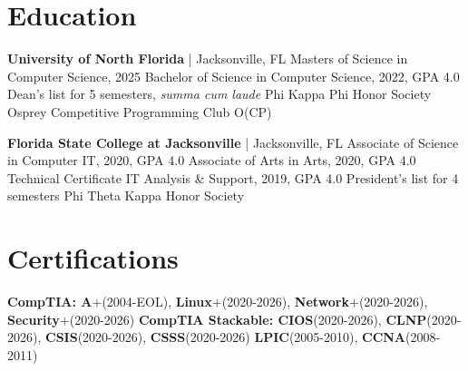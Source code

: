 \documentclass[10pt]{report}
\begin{document}
\vspace{-1em}
\section*{Education}
\vspace{-1.5em}
\setlength{\columnsep}{-2em}
\begin{multicols}{2}
\textbf{University of North Florida} | Jacksonville, FL \newline
Masters of Science in Computer Science, 2025 \newline
Bachelor of Science in Computer Science, 2022, GPA 4.0 \newline
Dean's list for 5 semesters, \textit{summa cum laude} \newline
Phi Kappa Phi Honor Society \newline
Osprey Competitive Programming Club O(CP)
\columnbreak

\textbf{Florida State College at Jacksonville} | Jacksonville, FL \newline
Associate of Science in Computer IT, 2020, GPA 4.0 \newline
Associate of Arts in Arts, 2020, GPA 4.0 \newline
Technical Certificate IT Analysis \& Support, 2019, GPA 4.0 \newline
President's list for 4 semesters \newline
Phi Theta Kappa Honor Society
\end{multicols}
\vspace{-1em}


\section*{Certifications}
\textbf{CompTIA: A$\bm{+}$}(2004-EOL), \textbf{Linux$\bm{+}$}(2020-2026), \textbf{Network$\bm{+}$}(2020-2026), \textbf{Security$\bm{+}$}(2020-2026)\newline
\textbf{CompTIA Stackable: CIOS}(2020-2026), \textbf{CLNP}(2020-2026), \textbf{CSIS}(2020-2026), \textbf{CSSS}(2020-2026)\newline
\textbf{LPIC}(2005-2010), \textbf{CCNA}(2008-2011)
\end{document}
